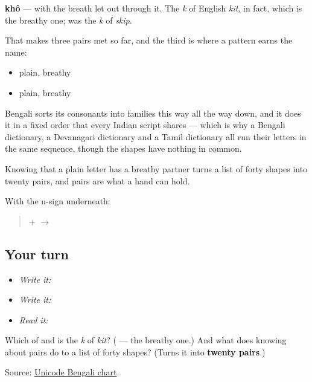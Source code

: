 \begin{quote}
\end{quote}

\textbf{khô} — \textbf{} with the breath let out through it. The \emph{k} of English \emph{kit}, in fact, which is the breathy one; \textbf{} was the \emph{k} of \emph{skip}.

That makes three pairs met so far, and the third is where a pattern earns the name:

\begin{itemize}
\raggedright
  \item \textbf{} plain, \textbf{} breathy
  \item \textbf{} plain, \textbf{} breathy
\end{itemize}

Bengali sorts its consonants into families this way all the way down, and it does it in a fixed order that every Indian script shares — which is why a Bengali dictionary, a Devanagari dictionary and a Tamil dictionary all run their letters in the same sequence, though the shapes have nothing in common.

Knowing that a plain letter has a breathy partner turns a list of forty shapes into twenty pairs, and pairs are what a hand can hold.

With the u-sign underneath:

\begin{quote}
\textbf{} + \textbf{} $\to$ \textbf{}
\end{quote}

\subsection*{Your turn}
\begin{itemize}
\raggedright
  \item \emph{Write it:} 
  \item \emph{Write it:}  
  \item \emph{Read it:} 
\end{itemize}

\begin{tcolorbox}[breakable,colback=teal!4,colframe=teal!35!black,title={Before you move on}]
Which of \textbf{} and \textbf{} is the \emph{k} of \emph{kit}? (\textbf{} — the breathy one.) And what does knowing about pairs do to a list of forty shapes? (Turns it into \textbf{twenty pairs}.)

Source: \href{https://www.unicode.org/charts/PDF/U0980.pdf}{Unicode Bengali chart}.
\end{tcolorbox}
